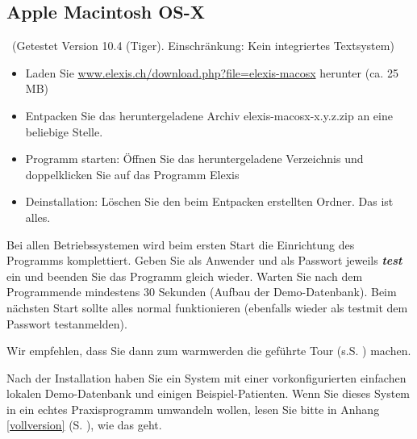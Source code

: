 \subsection{Apple Macintosh OS-X}\
(Getestet Version 10.4 (Tiger). Einschränkung: Kein integriertes Textsystem)
\begin{itemize}
	\item Laden Sie \href{http://www.elexis.ch/download.php?file=elexis-macosx}{www.elexis.ch/down\-load.php?file=elexis-macosx} herunter (ca. 25 MB)
	\item Entpacken Sie das heruntergeladene Archiv elexis-macosx-x.y.z.zip an eine beliebige Stelle.
    \item Programm starten: Öffnen Sie das herunter\-geladene Verzeichnis und doppel\-klic\-ken Sie auf das Pro\-gramm \glqq Elexis\grqq{}
	\item Deinstallation: Löschen Sie den beim Entpacken erstellten Ordner. Das ist alles.
\end{itemize}

Bei allen Betriebssystemen wird beim ersten Start die Einrichtung des Programms komplettiert.
Geben Sie als Anwender und als Passwort jeweils \textbf{\textit{test}}\index{Passwort}
ein und beenden Sie das Programm gleich wieder. Warten Sie nach dem Programmende mindestens 30 Sekunden (Aufbau der Demo-Datenbank). Beim nächsten Start sollte alles normal funktionieren (ebenfalls wieder als \glqq test\grqq mit dem Passwort \glqq test\grqq anmelden).

Wir empfehlen, dass Sie dann zum \glqq warmwerden\grqq{} die geführte Tour (s.S.
\pageref{tour}) machen.

\bigskip
Nach der Installation haben Sie ein System mit einer vorkonfigurierten einfachen
lokalen Demo-Datenbank und einigen Beispiel-Patienten. Wenn Sie dieses System in ein
\glqq echtes\grqq{} Praxisprogramm umwandeln wollen, lesen Sie bitte in Anhang
\ref{vollversion} (S. \pageref{vollversion}), wie das geht.

